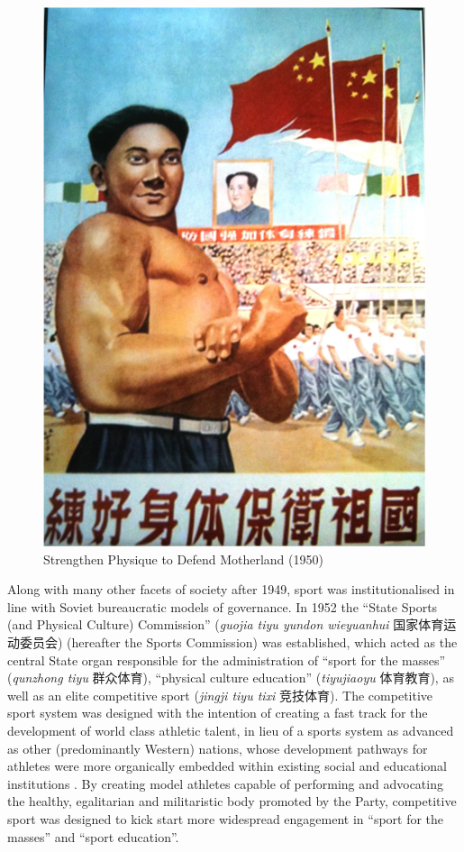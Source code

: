 \begin{CJK}{UTF8}{gbsn}
    \begin{figure}[htbp]
      \includegraphics[width = \linewidth]{images/motherlandStrength.png}
      \caption{Strengthen Physique to Defend Motherland (1950)}
      \label{fig:motherlandStrength}
    \end{figure}

Along with many other facets of society after 1949, sport was institutionalised in line with Soviet bureaucratic models of governance.  In 1952 the ``State Sports (and Physical Culture) Commission'' (\textit{guojia tiyu yundon wieyuanhui} 国家体育运动委员会) (hereafter the Sports Commission) was established, which acted as the central State organ responsible for the administration of ``sport for the masses'' (\textit{qunzhong tiyu} 群众体育), ``physical culture education'' (\textit{tiyujiaoyu} 体育教育), as well as an elite competitive sport (\textit{jingji tiyu tixi} 竞技体育).  The competitive sport system was designed with the intention of creating a fast track for the development of world class athletic talent, in lieu of a sports system as advanced as other (predominantly Western) nations, whose development pathways for athletes were more organically embedded within existing social and educational institutions \citep{Brownell2008}.  By creating model athletes capable of performing and advocating the healthy, egalitarian and militaristic body promoted by the Party, competitive sport was designed to kick start more widespread engagement in ``sport for the masses'' and ``sport education''\citep[56]{Brownell1995}.


\end{CJK}
